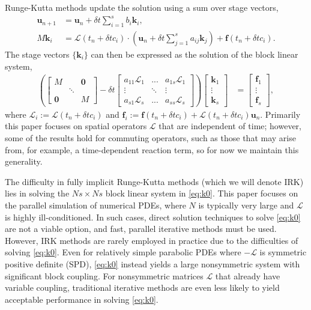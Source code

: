 \documentclass[review]{siamart}
\begin{document}
Runge-Kutta methods update the solution using a sum over stage vectors,
%
\begin{align}\label{eq:update}
\mathbf{u}_{n+1} & = \mathbf{u}_n + \delta t \sum_{i=1}^s b_i\mathbf{k}_i, \\
M\mathbf{k}_i & = \mathcal{L}(t_n+\delta tc_i)\cdot
	\left(\mathbf{u}_n + \delta t\sum_{j=1}^s a_{ij}\mathbf{k}_j\right) +
	\mathbf{f}(t_n+\delta tc_i).\label{eq:stages}
\end{align}
%
The stage vectors $\{\mathbf{k}_i\}$ can then be expressed as the solution of the block linear
system,
%
\begin{align}\label{eq:k0}
\left( \begin{bmatrix} M  & & \mathbf{0} \\ & \ddots \\ \mathbf{0} & & M\end{bmatrix}
	- \delta t \begin{bmatrix} a_{11}\mathcal{L}_1 & ... & a_{1s}\mathcal{L}_1 \\
	\vdots & \ddots & \vdots \\ a_{s1}\mathcal{L}_s & ... & a_{ss} \mathcal{L}_s \end{bmatrix} \right)
	\begin{bmatrix} \mathbf{k}_1 \\ \vdots \\ \mathbf{k}_s \end{bmatrix}
& = \begin{bmatrix} \mathbf{f}_1 \\ \vdots \\ \mathbf{f}_s \end{bmatrix},
\end{align}
%
where $\mathcal{L}_i := \mathcal{L}(t_n+\delta tc_i)$ and $\mathbf{f}_i :=
\mathbf{f}(t_n+\delta tc_i) + \mathcal{L}(t_n+\delta tc_i)\mathbf{u}_n$. Primarily this paper
focuses on spatial operators $\mathcal{L}$ that are independent of time; however, some of
the results hold for commuting operators, such as those that may arise from, for example,
a time-dependent reaction term, so for now we maintain this generality.

The difficulty in fully implicit Runge-Kutta methods (which we will denote IRK) lies in
solving the $Ns\times Ns$ block linear system in \eqref{eq:k0}. This paper focuses on the
parallel simulation of numerical PDEs, where $N$ is typically very large
and $\mathcal{L}$ is highly ill-conditioned. In such cases, direct
solution techniques to solve \eqref{eq:k0} are not a viable option, and fast, parallel
iterative methods must be used. However, IRK methods are rarely employed in practice due
to the difficulties of solving \eqref{eq:k0}. Even for relatively simple
parabolic PDEs where $-\mathcal{L}$ is symmetric positive definite (SPD), \eqref{eq:k0}
instead yields a large nonsymmetric system with significant block coupling. For
nonsymmetric matrices $\mathcal{L}$ that already have variable coupling, traditional
iterative methods are even less likely to yield acceptable performance in solving
\eqref{eq:k0}.
\end{document}
